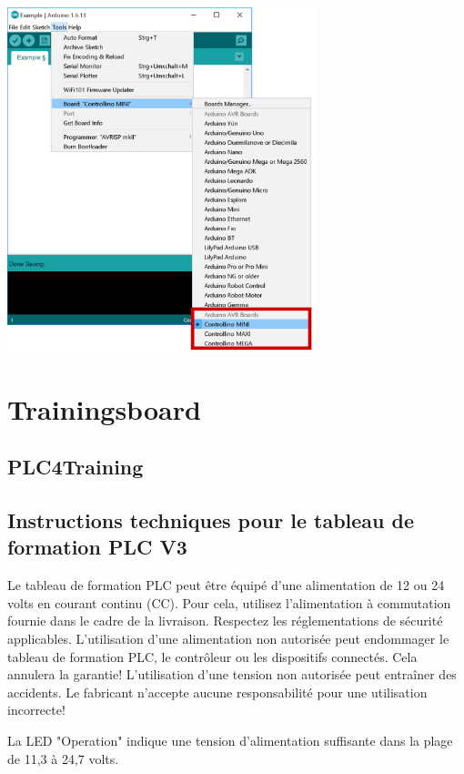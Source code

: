 \documentclass[a4paper,12pt]{report}
\begin{document}
\begin{center}
\includegraphics[height=10cm]{choisir la cart de controllino.png}
\label{}
\end{center}


\chapter{\textbf{Trainingsboard }}
\section{PLC4Training}


\section{Instructions techniques pour le tableau de formation PLC V3}
Le tableau de formation PLC peut être équipé d'une alimentation de 12 ou 24 volts en courant continu (CC). Pour cela, utilisez l'alimentation à commutation fournie dans le cadre de la livraison. Respectez les réglementations de sécurité applicables. L'utilisation d'une alimentation non autorisée peut endommager le tableau de formation PLC, le contrôleur ou les dispositifs connectés. Cela annulera la garantie! L'utilisation d'une tension non autorisée peut entraîner des accidents. Le fabricant n'accepte aucune responsabilité pour une utilisation incorrecte!

La LED "Operation" indique une tension d'alimentation suffisante dans la plage de 11,3 à 24,7 volts.
\end{document}
